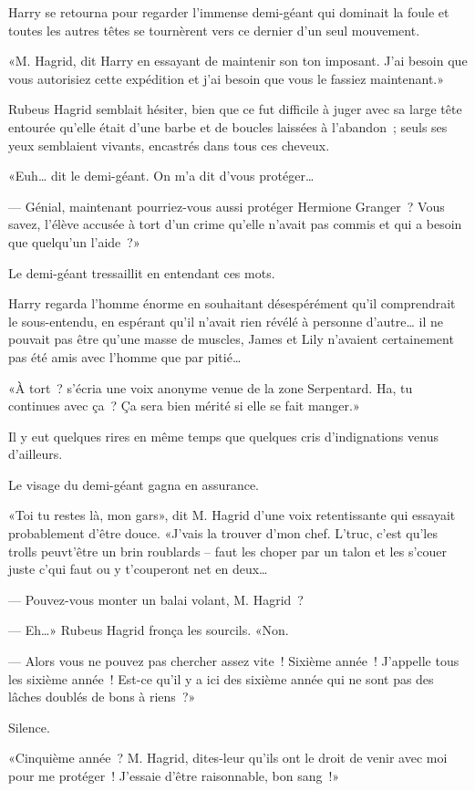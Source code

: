 Harry se retourna pour regarder l'immense demi-géant qui dominait la foule et toutes les autres têtes se tournèrent vers ce dernier d'un seul mouvement.

«M. Hagrid, dit Harry en essayant de maintenir son ton imposant. J'ai besoin que vous autorisiez cette expédition et j'ai besoin que vous le fassiez maintenant.»

Rubeus Hagrid semblait hésiter, bien que ce fut difficile à juger avec sa large tête entourée qu'elle était d'une barbe et de boucles laissées à l'abandon~; seuls ses yeux semblaient vivants, encastrés dans tous ces cheveux.

«Euh… dit le demi-géant. On m'a dit d'vous protéger…

--- Génial, maintenant pourriez-vous aussi protéger Hermione Granger~? Vous savez, l'élève accusée à tort d'un crime qu'elle n'avait pas commis et qui a besoin que quelqu'un l'aide~?»

Le demi-géant tressaillit en entendant ces mots.

Harry regarda l'homme énorme en souhaitant désespérément qu'il comprendrait le sous-entendu, en espérant qu'il n'avait rien révélé à personne d'autre… il ne pouvait pas être qu'une masse de muscles, James et Lily n'avaient certainement pas été amis avec l'homme que par pitié…

«À tort~? s'écria une voix anonyme venue de la zone Serpentard. Ha, tu continues avec ça~? Ça sera bien mérité si elle se fait manger.»

Il y eut quelques rires en même temps que quelques cris d'indignations venus d'ailleurs.

Le visage du demi-géant gagna en assurance.

«Toi tu restes là, mon gars», dit M. Hagrid d'une voix retentissante qui essayait probablement d'être douce. «J'vais la trouver d'mon chef. L'truc, c'est qu'les trolls peuvt'être un brin roublards -- faut les choper par un talon et les s'couer juste c'qui faut ou y t'couperont net en deux…

--- Pouvez-vous monter un balai volant, M. Hagrid~?

--- Eh…» Rubeus Hagrid fronça les sourcils. «Non.

--- Alors vous ne pouvez pas chercher assez vite~! Sixième année~! J'appelle tous les sixième année~! Est-ce qu'il y a ici des sixième année qui ne sont pas des lâches doublés de bons à riens~?»

Silence.

«Cinquième année~? M. Hagrid, dites-leur qu'ils ont le droit de venir avec moi pour me protéger~! J'essaie d'être raisonnable, bon sang~!»

